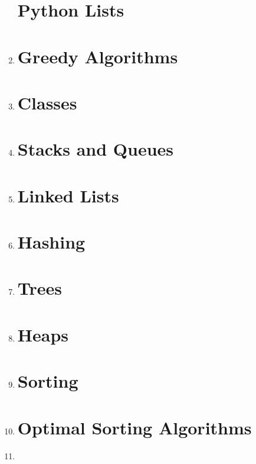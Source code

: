 \documentclass[11pt]{article}
\begin{document}
\begin{enumerate}
\section*{Python Lists}
	\item 

\section*{Greedy Algorithms}
	\item 

\section*{Classes}
	\item 

\section*{Stacks and Queues}
	\item 

\section*{Linked Lists}
	\item 

\section*{Hashing}
	\item 

\section*{Trees}
	\item 

\section*{Heaps}
	\item 

\section*{Sorting}
	\item 

\section*{Optimal Sorting Algorithms}
	\item 

\end{enumerate}
\end{document}
